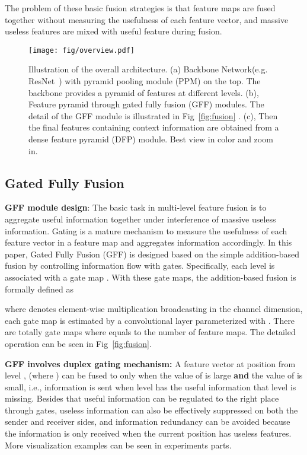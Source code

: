 \documentclass[letterpaper]{article} \usepackage{aaai20}  \usepackage{times}  \usepackage{helvet} \usepackage{courier}  \usepackage[hyphens]{url}  \usepackage{graphicx} \urlstyle{rm} \def\UrlFont{\rm}  \usepackage{graphicx}  \usepackage{amsmath}
\begin{document}
The problem of these basic fusion strategies is that feature maps are fused together without measuring the usefulness of each feature vector, and massive useless features are mixed with useful feature during fusion.
    
\begin{figure}
\centering
\texttt{[image: fig/overview.pdf]}
\caption{\small{
Illustration of the overall architecture. 
(a) Backbone Network(e.g. ResNet~\cite{resnet}) with pyramid pooling module (PPM) \cite{pspnet} on the top.
The backbone provides a pyramid of features at different levels. (b), Feature pyramid through gated fully fusion (GFF) modules. The detail of the GFF module is illustrated in Fig~\ref{fig:fusion} . (c), Then the final features containing context information are obtained from a dense feature pyramid (DFP) module. Best view in color and zoom in.} }
\label{fig:overview}
\end{figure}

\subsection{Gated Fully Fusion}
\label{subsec:gated}
\textbf{GFF module design}: The basic task in multi-level feature fusion is to aggregate useful information together under interference of massive useless information. Gating is a mature mechanism to measure the usefulness of each feature vector in a feature map and aggregates information accordingly. In this paper, Gated Fully Fusion (GFF) is designed based on the simple addition-based fusion by controlling information flow with gates. Specifically, each level  is associated with a gate map . With these gate maps, the addition-based fusion is formally defined as

where  denotes element-wise multiplication broadcasting in the channel dimension, each gate map  is estimated by a convolutional layer parameterized with . There are totally  gate maps where  equals to the number of feature maps. The detailed operation can be seen in Fig~\ref{fig:fusion}.

\noindent
\textbf{GFF involves duplex gating mechanism: } A feature vector at position  from level , (where ) can be fused to  only when the value of  is large \textbf{and} the value of  is small, i.e., information is sent when level  has the useful information that level  is missing. Besides that useful information can be regulated to the right place through gates, useless information can also be effectively suppressed on both the sender and receiver sides, and information redundancy can be avoided because the information is only received when the current position has useless features. More visualization examples can be seen in experiments parts. 
\end{document}
